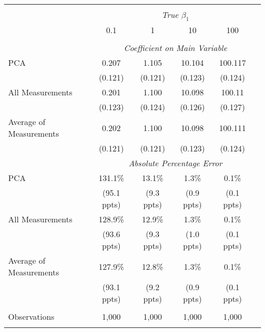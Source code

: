 \begin{table}[!htbp] \centering
\begin{tabular}{@{\extracolsep{5pt}}lccccc}
\\[-1.8ex]\hline
\hline \\[-1.8ex]
& \multicolumn{5}{c}{\textit{True $\beta_1$}} \
\cr 
\\[-1.8ex] & 0.1 & 1 & 10 & 100 \\
\hline \\[-1.8ex]
& \multicolumn{5}{c}{\textit{Coefficient on Main Variable}} \\
 PCA & 0.207 & 1.105 & 10.104 & 100.117  \\
  & (0.121) & (0.121) & (0.123) & (0.124)\\
 All Measurements & 0.201 & 1.100 & 10.098 & 100.11  \\
  & (0.123) & (0.124) & (0.126) & (0.127)\\
 Average of Measurements & 0.202 & 1.100 & 10.098 & 100.111  \\
  & (0.121) & (0.121) & (0.123) & (0.124)\\
& \multicolumn{5}{c}{\textit{Absolute Percentage Error}} \\
  PCA & 131.1\% & 13.1\% & 1.3\% & 0.1\%  \\
   & (95.1 ppts) & (9.3 ppts) & (0.9 ppts) & (0.1 ppts)\\
All Measurements & 128.9\% & 12.9\% & 1.3\% & 0.1\%  \\
  & (93.6 ppts) & (9.3 ppts) & (1.0 ppts) & (0.1 ppts)\\
  Average of Measurements & 127.9\% & 12.8\% & 1.3\% & 0.1\%  \\
  & (93.1 ppts) & (9.2 ppts) & (0.9 ppts) & (0.1 ppts)\\
\hline \\[-1.8ex]
 Observations & 1,000 & 1,000 & 1,000 & 1,000 &\\
\hline
\hline \\[-1.8ex]
\end{tabular}
\end{table}